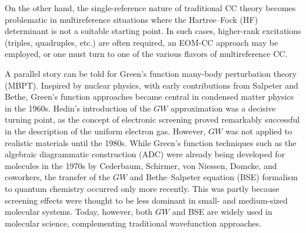 \documentclass[aip,jcp,reprint,noshowkeys,superscriptaddress]{revtex4-2}
\begin{document}
On the other hand, the single-reference nature of traditional CC theory becomes problematic in multireference situations where the Hartree--Fock (HF) determinant is not a suitable starting point. 
In such cases, higher-rank excitations (triples, quadruples, etc.) are often required, an EOM-CC approach may be employed, \cite{Musial_2003a,Musial_2003b,Krylov_2008,Shen_2013,Gulania_2019} or one must turn to one of the various flavors of multireference CC. \cite{Musial_2008,Musial_2011,Lyakh_2012,Kohn_2013,Krylov_2017,Evangelista_2018}

A parallel story can be told for Green's function many-body perturbation theory (MBPT). \cite{Onida_2002,Martin_2016} 
Inspired by nuclear physics, with early contributions from Salpeter and Bethe, \cite{Salpeter_1951} Green's function approaches became central in condensed matter physics in the 1960s. 
Hedin's introduction of the $GW$ approximation\cite{Hedin_1965,Aryasetiawan_1998,Reining_2017} was a decisive turning point, as the concept of electronic screening proved remarkably successful in the description of the uniform electron gas. \cite{Lundqvist_1967b,Lundqvist_1967a,Mahan_1989} 
However, $GW$ was not applied to realistic materials until the 1980s. \cite{Strinati_1982a,Strinati_1982b,Hybertsen_1985,Hybertsen_1986,Godby_1986,Godby_1987a}
While Green's function techniques such as the algebraic diagrammatic construction (ADC) \cite{Schirmer_2018,Dreuw_2023} were already being developed for molecules in the 1970s by Cederbaum, Schirmer, von Niessen, Domcke, and coworkers, \cite{Cederbaum_1974,Schirmer_1977,Cederbaum_1977,vonNiessen_1979,Cederbaum_1980,vonNiessen_1981,vonNiessen_1984,Cederbaum_1990} the transfer of the $GW$ and Bethe–Salpeter equation (BSE) formalism to quantum chemistry occurred only more recently. \cite{Shirley_1993,Rohlfing_2000,Stan_2006,Rostgaard_2010,Blase_2011b,Faber_2011,Ke_2011,Bruneval_2012,Bruneval_2013} This was partly because screening effects were thought to be less dominant in small- and medium-sized molecular systems.
Today, however, both $GW$ \cite{Golze_2019,Marie_2024a} and BSE \cite{Blase_2018,Blase_2020} are widely used in molecular science, complementing traditional wavefunction approaches.
\end{document}
